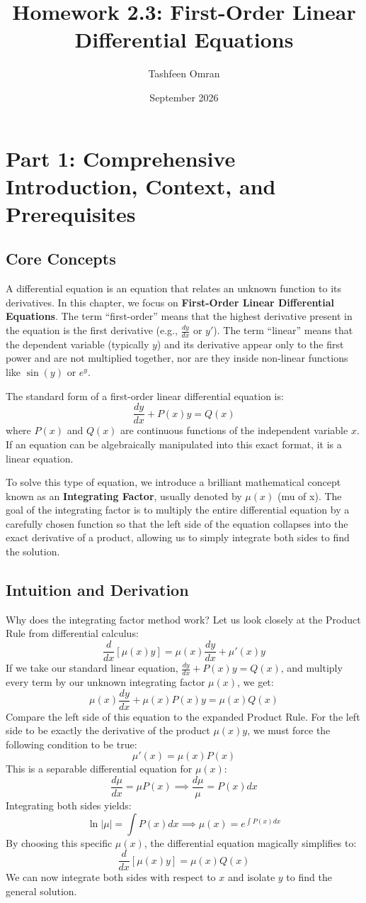 \documentclass[11pt]{article}
\title{Homework 2.3: First-Order Linear Differential Equations}
\author{Tashfeen Omran}
\date{September 2026}
\begin{document}
\maketitle

\tableofcontents
\newpage

\section{Part 1: Comprehensive Introduction, Context, and Prerequisites}

\subsection{Core Concepts}
A differential equation is an equation that relates an unknown function to its derivatives. In this chapter, we focus on \textbf{First-Order Linear Differential Equations}. The term ``first-order'' means that the highest derivative present in the equation is the first derivative (e.g., $\frac{dy}{dx}$ or $y'$). The term ``linear'' means that the dependent variable (typically $y$) and its derivative appear only to the first power and are not multiplied together, nor are they inside non-linear functions like $\sin(y)$ or $e^y$. 

The standard form of a first-order linear differential equation is:
\[ \frac{dy}{dx} + P(x)y = Q(x) \]
where $P(x)$ and $Q(x)$ are continuous functions of the independent variable $x$. If an equation can be algebraically manipulated into this exact format, it is a linear equation.

To solve this type of equation, we introduce a brilliant mathematical concept known as an \textbf{Integrating Factor}, usually denoted by $\mu(x)$ (mu of x). The goal of the integrating factor is to multiply the entire differential equation by a carefully chosen function so that the left side of the equation collapses into the exact derivative of a product, allowing us to simply integrate both sides to find the solution.

\subsection{Intuition and Derivation}
Why does the integrating factor method work? Let us look closely at the Product Rule from differential calculus:
\[ \frac{d}{dx} [\mu(x) y] = \mu(x) \frac{dy}{dx} + \mu'(x) y \]
If we take our standard linear equation, $\frac{dy}{dx} + P(x)y = Q(x)$, and multiply every term by our unknown integrating factor $\mu(x)$, we get:
\[ \mu(x) \frac{dy}{dx} + \mu(x) P(x)y = \mu(x) Q(x) \]
Compare the left side of this equation to the expanded Product Rule. For the left side to be exactly the derivative of the product $\mu(x)y$, we must force the following condition to be true:
\[ \mu'(x) = \mu(x) P(x) \]
This is a separable differential equation for $\mu(x)$:
\[ \frac{d\mu}{dx} = \mu P(x) \implies \frac{d\mu}{\mu} = P(x) dx \]
Integrating both sides yields:
\[ \ln|\mu| = \int P(x) dx \implies \mu(x) = e^{\int P(x) dx} \]
By choosing this specific $\mu(x)$, the differential equation magically simplifies to:
\[ \frac{d}{dx} [\mu(x) y] = \mu(x) Q(x) \]
We can now integrate both sides with respect to $x$ and isolate $y$ to find the general solution.
\end{document}

